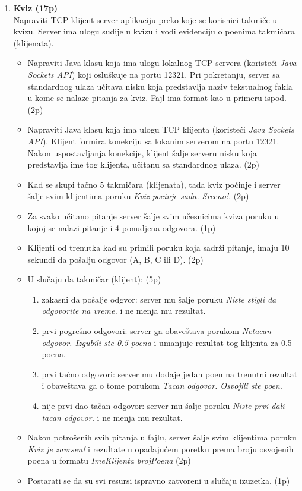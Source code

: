 \documentclass[]{article}
\begin{document}
\begin{enumerate}
  
\item \textbf{Kviz (17p)}
\\Napraviti TCP klijent-server aplikaciju preko koje se korisnici takmi\v{c}e u kvizu. Server ima ulogu sudije u kvizu i vodi evidenciju o poenima takmičara (klijenata).
\begin{itemize}
  \item Napraviti Java klasu koja ima ulogu lokalnog TCP servera (koriste\'c{}i \textit{Java Sockets API}) koji oslu\v{s}kuje na portu 12321. Pri pokretanju, server sa standardnog ulaza u\v{c}itava nisku koja predstavlja naziv tekstualnog fakla u kome se nalaze pitanja za kviz. Fajl ima format kao u primeru ispod. \hfill (2p)
  \item Napraviti Java klasu koja ima ulogu TCP klijenta (koriste\'c{}i \textit{Java Sockets API}). Klijent formira konekciju sa lokanim serverom na portu 12321. Nakon uspostavljanja konekcije, klijent \v{s}alje serveru nisku koja predstavlja ime tog klijenta, učitanu sa standardnog ulaza. \hfill (2p)
  \item Kad se skupi ta\v{c}no 5 takmi\v{c}ara (klijenata), tada kviz po\v{c}inje i server \v{s}alje svim klijentima poruku \textit{Kviz pocinje sada. Srecno!}. \hfill (2p)
  \item Za svako u\v{c}itano pitanje server \v{s}alje svim u\v{c}esnicima kviza poruku u kojoj se nalazi pitanje i 4 ponudjena odgovora. \hfill (1p)
  \item Klijenti od trenutka kad su primili poruku koja sadr\v{z}i pitanje, imaju 10 sekundi da po\v{s}alju odgovor (A, B, C ili D). \hfill (2p) 
  \item U slu\v{c}aju da takmi\v{c}ar (klijent):  \hfill (5p)
  \begin{enumerate}
      \item zakasni da po\v{s}alje odgvor: server mu \v{s}alje poruku \textit{Niste stigli da odgovorite na vreme.} i ne menja mu rezultat.
      \item prvi pogre\v{s}no odgovori: server ga obave\v{s}tava porukom \textit{Netacan odgovor. Izgubili ste 0.5 poena} i umanjuje rezultat tog klijenta za 0.5 poena.
      \item prvi ta\v{c}no odgovori: server mu dodaje jedan poen na trenutni rezultat i obave\v{s}tava ga o tome porukom \textit{Tacan odgovor. Osvojili ste poen}.
      \item nije prvi dao ta\v{c}an odgovor: server mu \v{s}alje poruku \textit{Niste prvi dali tacan odgovor.} i ne menja mu rezultat.
  \end{enumerate}
  \item Nakon potro\v{s}enih svih pitanja u fajlu, server \v{s}alje svim klijentima poruku \textit{Kviz je zavrsen!} i rezultate u opadajućem poretku prema broju osvojenih poena u formatu \textit{ImeKlijenta brojPoena} \hfill (2p)
  \item Postarati se da su svi resursi ispravno zatvoreni u slu\v{c}aju izuzetka. \hfill (1p)
\end{itemize}


\end{enumerate}
\end{document}
